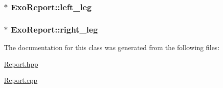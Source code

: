\subsubsection[{\texorpdfstring{left\+\_\+leg}{left_leg}}]{$\ast$ Exo\+Report\+::left\+\_\+leg}\hypertarget{classExoReport_a246f0e7f3d659b0ad46589f0219b68f0}{}\label{classExoReport_a246f0e7f3d659b0ad46589f0219b68f0}
\subsubsection[{\texorpdfstring{right\+\_\+leg}{right_leg}}]{$\ast$ Exo\+Report\+::right\+\_\+leg}\hypertarget{classExoReport_af47a02ce1af583c62ee962100c7a8a73}{}\label{classExoReport_af47a02ce1af583c62ee962100c7a8a73}


The documentation for this class was generated from the following files\+:\begin{DoxyCompactItemize}
\item 
\hyperlink{Report_8hpp}{Report.\+hpp}\item 
\hyperlink{Report_8cpp}{Report.\+cpp}\end{DoxyCompactItemize}

